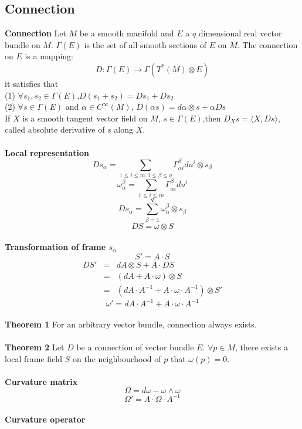 \documentclass{article}
\begin{document}
\subsection{Connection}
\textbf{Connection} Let $M$ be a smooth manifold and $E$ a $q$ dimensional real vector bundle on $M$. $\Gamma(E)$ is the set of all smooth sections of $E$ on $M$. The connection on $E$ is a mapping:
\[D:\Gamma(E) \to \Gamma(T^*(M) \otimes E)\]
it satisfies that\\
(1) $\forall s_1 ,s_2 \in \Gamma(E)$,$D(s_1+s_2) = Ds_1+Ds_2$\\
(2) $\forall s \in \Gamma(E)$ and $\alpha \in C^{\infty}(M)$, $D(\alpha s) = d\alpha \otimes s + \alpha Ds$\\
If $X$ is a smooth tangent vector field on $M$, $s \in \Gamma(E)$,then
$D_{X}s = \langle X, Ds \rangle$, called absolute derivative of $s$ along $X$.\\ \\
\textbf{Local representation}\\
\[Ds_{\alpha} = \sum_{1 \leq i \leq m,1 \leq \beta \leq q} \Gamma^{\beta}_{\alpha i} du^i \otimes s_{\beta}\]
\[\omega^{\beta}_{\alpha} = \sum_{1 \leq i \leq m} \Gamma^{\beta}_{\alpha i} du^i\]
\[Ds_{\alpha} = \sum_{\beta=1}^{q} \omega^{\beta}_{\alpha} \otimes s_{\beta}\]
\[DS = \omega \otimes S\]\\
\textbf{Transformation of frame $s_{\alpha}$}\\
\[S' = A \cdot S\] 
\begin{eqnarray}
DS' &=& dA \otimes S + A \cdot DS \nonumber \\
&=& (dA + A \cdot \omega) \otimes S \nonumber \\
&=& (dA \cdot A^{-1} + A \cdot \omega \cdot A^{-1}) \otimes S' \nonumber
\end{eqnarray}
\[\omega' = dA \cdot A^{-1} + A \cdot \omega \cdot A^{-1}\]\\
\textbf{Theorem 1} For an arbitrary vector bundle, connection always exists.\\ \\
\textbf{Theorem 2} Let $D$ be a connection of vector bundle $E$. $\forall p \in M$, there exists a local frame field $S$ on the neighbourhood of $p$ that $\omega(p) =0$.\\ \\
\textbf{Curvature matrix}\\
\[\Omega = d\omega - \omega \wedge \omega\]
\[\Omega' = A \cdot \Omega \cdot A^{-1}\]\\
\textbf{Curvature operator}\\
\end{document}
